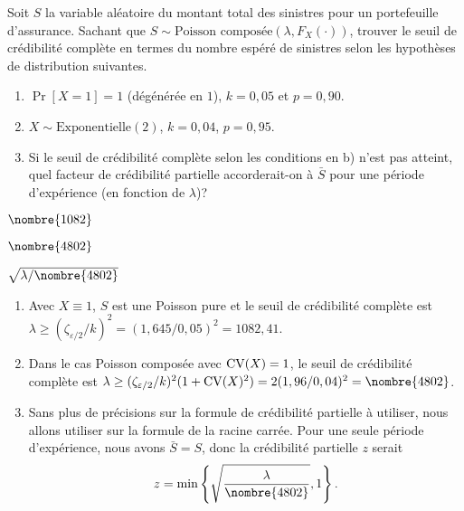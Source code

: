 \begin{exercice}
  Soit $S$ la variable aléatoire du montant total des sinistres pour
  un portefeuille d'assurance. Sachant que $S \sim \text{Poisson
    composée}(\lambda, F_X(\cdot))$, trouver le seuil de crédibilité
  complète en termes du nombre espéré de sinistres selon les
  hypothèses de distribution suivantes.
  \begin{enumerate}
  \item $\Pr[X = 1] = 1$ (dégénérée en $1$), $k = 0,05$ et $p = 0,90$.
  \item $X \sim \text{Exponentielle}(2)$, $k = 0,04$, $p = 0,95$.
  \item Si le seuil de crédibilité complète selon les conditions en b)
    n'est pas atteint, quel facteur de crédibilité partielle
    accorderait-on à $\bar{S}$ pour une période d'expérience (en
    fonction de $\lambda$)?
  \end{enumerate}
  \begin{rep}
    \begin{inparaenum}
    \item $\nombre{1082}$
    \item $\nombre{4802}$
    \item $\sqrt{\lambda/\nombre{4802}}$
    \end{inparaenum}
  \end{rep}
  \begin{sol}
    \begin{enumerate}
    \item Avec $X \equiv 1$, $S$ est une Poisson pure et le seuil de
      crédibilité complète est $\lambda \geq
      (\zeta_{\varepsilon/2}/k)^2 = (1,645/0,05)^2 = 1082,41$.
    \item Dans le cas Poisson composée avec $\operatorname{CV}(X) = 1$, le
      seuil de crédibilité complète est $\lambda \geq
      (\zeta_{\varepsilon/2}/k)^2 (1 + \CV(X)^2) = 2
      (1,96/0,04)^2 = \nombre{4802}$.
    \item Sans plus de précisions sur la formule de crédibilité
      partielle à utiliser, nous allons utiliser sur la formule de la
      racine carrée. Pour une seule période d'expérience, nous avons
      $\bar{S} = S$, donc la crédibilité partielle $z$ serait
      \begin{equation*}
        z = \min
        \left\{
          \sqrt{\frac{\lambda}{\nombre{4802}}}, 1
        \right\}.
      \end{equation*}
    \end{enumerate}
  \end{sol}
\end{exercice}

